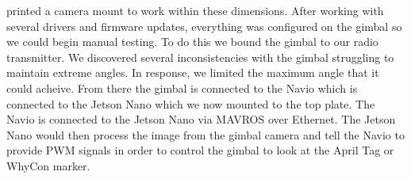 printed a camera mount to work within these dimensions. After working with several drivers and firmware updates, everything was configured on the gimbal so we could begin manual testing. To do this we bound the gimbal to our radio transmitter. We discovered several inconsistencies with the gimbal struggling to maintain extreme angles. In response, we limited the maximum angle that it could acheive. From there the gimbal is connected to the Navio which is connected to the Jetson Nano which we now mounted to the top plate. The Navio is connected to the Jetson Nano via MAVROS over Ethernet. The Jetson Nano would then process the image from the gimbal camera and tell the Navio to provide PWM signals in order to control the gimbal to look at the April Tag or WhyCon marker. 
